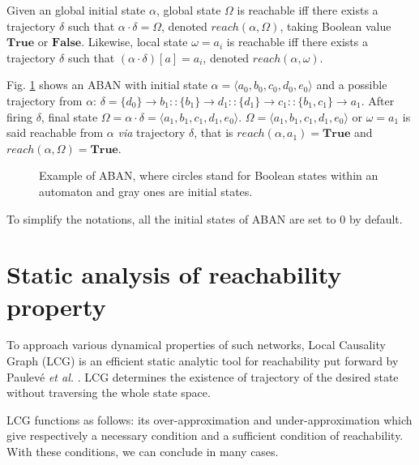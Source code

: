 \documentclass[runningheads]{llncs}
\newcommand{\acm}[3]{\{#1\}\rightarrow#3}
\begin{document}
\begin{definition}[Reachability]
Given an global initial state $\alpha$, global state $\Omega$ is reachable iff there exists a trajectory $\delta$ such that $\alpha\cdot \delta=\Omega$, denoted $reach(\alpha, \Omega)$, taking Boolean value $\mathbf{True}$ or $\mathbf{False}$.
Likewise, local state $\omega=a_i$ is reachable iff there exists a trajectory $\delta$ such that $(\alpha\cdot \delta)[a]=a_i$, denoted $reach(\alpha, \omega)$.
\end{definition}
\begin{example}\label{example:aban}
Fig. \ref{fig:1} shows an ABAN with initial state $\alpha=\langle a_0,b_0,c_0,d_0,e_0\rangle$ and a possible trajectory from $\alpha$: $\delta=\acm{d_0}{b_0}{b_1}::\acm{b_1}{d_0}{d_1}::\acm{d_1}{c_0}{c_1}::\acm{b_1,c_1}{a_0}{a_1}$. After firing $\delta$, final state $\Omega=\alpha\cdot \delta=\langle a_1,b_1,c_1,d_1,e_0\rangle$.
$\Omega=\langle a_1,b_1,c_1,d_1,e_0\rangle$ or $\omega=a_1$ is said reachable from $\alpha$ \textit{via} trajectory $\delta$, that is $reach(\alpha,a_1)=\mathbf{True}$ and $reach(\alpha,\Omega)=\mathbf{True}$.
\end{example}
\begin{figure}[ht]
\centering

\caption{Example of ABAN, where circles stand for Boolean states within an automaton and gray ones are initial states.}\label{fig:1}
\end{figure}	

To simplify the notations, all the initial states of ABAN are set to 0 by default.
\section{Static analysis of reachability property}\label{sect:3}
To approach various dynamical properties of such networks, Local Causality Graph (LCG) is an efficient static analytic tool for reachability put forward by Paulev\'e \textit{et al.} \cite{pauleve2011}. 
LCG determines the existence of trajectory of the desired state without traversing the whole state space.

LCG functions as follows: its over-approximation and under-approximation which give respectively a necessary condition and a sufficient condition of reachability. 
With these conditions, we can conclude in many cases.
\end{document}
